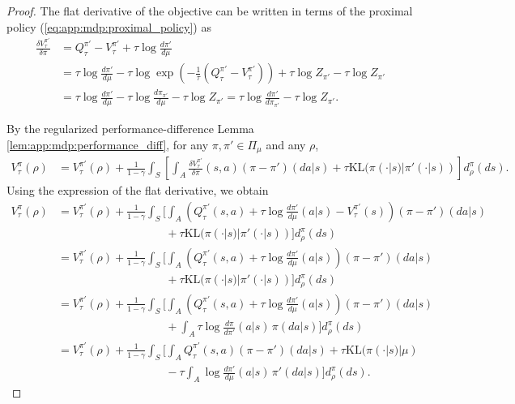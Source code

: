 \documentclass[10pt,a4paper]{amsart}
\begin{document}
\begin{proof}
The flat derivative of the objective can be written in terms of the proximal
policy (\ref{eq:app:mdp:proximal_policy}) as
\begin{align}
\frac{\delta V_\tau^{\pi'}}{\delta \pi}
&=
Q_\tau^{\pi'}-V_\tau^{\pi'}
+
\tau \log \frac{d\pi'}{d\mu}
\nonumber \\
&=
\tau \log \frac{d\pi'}{d\mu}
-
\tau
\log
\exp\left(
-\frac{1}{\tau}
\left(Q_\tau^{\pi'}-V_\tau^{\pi'}\right)
\right)
+
\tau \log Z_{\pi'}
-
\tau \log Z_{\pi'}
\nonumber \\
&=
\tau \log \frac{d\pi'}{d\mu}
-
\tau \log \frac{d\pi_{\pi'}}{d\mu}
-
\tau \log Z_{\pi'}
=
\tau \log \frac{d\pi'}{d\pi_{\pi'}}
-
\tau \log Z_{\pi'} .
\label{eq:sandwich-flat-derivative}
\end{align}

By the regularized performance-difference Lemma \ref{lem:app:mdp:performance_diff}, for any $\pi,\pi' \in \Pi_\mu$ and
any $\rho$,
\begin{align}
V_\tau^\pi(\rho)
&=
V_\tau^{\pi'}(\rho)
+
\frac{1}{1-\gamma}
\int_S
\left[
\int_A
\frac{\delta V_\tau^{\pi'}}{\delta \pi}(s,a)
(\pi-\pi')(da| s)
+
\tau \mathrm{KL}(\pi(\cdot | s)| \pi'(\cdot | s))
\right]
d_\rho^\pi(ds).
\label{eq:sandwich-performance-difference}
\end{align}
Using the expression of the flat derivative, we obtain
\begin{align}
V_\tau^\pi(\rho)
&=
V_\tau^{\pi'}(\rho)
+
\frac{1}{1-\gamma}
\int_S
\bigg[
\int_A
\left(
Q_\tau^{\pi'}(s,a)
+
\tau \log \frac{d\pi'}{d\mu}(a|s)
-
V_\tau^{\pi'}(s)
\right)
(\pi-\pi')(da| s)
\nonumber \\
&\hspace{4cm}
+
\tau \mathrm{KL}(\pi(\cdot | s)| \pi'(\cdot |s))
\bigg]
d_\rho^\pi(ds)
\nonumber \\
&=
V_\tau^{\pi'}(\rho)
+
\frac{1}{1-\gamma}
\int_S
\bigg[
\int_A
\left(
Q_\tau^{\pi'}(s,a)
+
\tau \log \frac{d\pi'}{d\mu}(a|s)
\right)
(\pi-\pi')(da| s)
\nonumber \\
&\hspace{4cm}
+
\tau \mathrm{KL}(\pi(\cdot | s)| \pi'(\cdot |s))
\bigg]
d_\rho^\pi(ds)
\nonumber \\
&=
V_\tau^{\pi'}(\rho)
+
\frac{1}{1-\gamma}
\int_S
\bigg[
\int_A
\left(
Q_\tau^{\pi'}(s,a)
+
\tau \log \frac{d\pi'}{d\mu}(a | s)
\right)
(\pi-\pi')(da| s)
\nonumber \\
&\hspace{4cm}
+
\int_A
\tau \log \frac{d\pi}{d\pi'}(a | s)
\,\pi(da| s)
\bigg]
d_\rho^\pi(ds)
\nonumber \\
&=
V_\tau^{\pi'}(\rho)
+
\frac{1}{1-\gamma}
\int_S
\bigg[
\int_A
Q_\tau^{\pi'}(s,a)
(\pi-\pi')(da| s)
+
\tau \mathrm{KL}(\pi(\cdot |s)| \mu)
\nonumber \\
&\hspace{4cm}
-
\tau
\int_A
\log \frac{d\pi'}{d\mu}(a|s)
\,\pi'(da| s)
\bigg]
d_\rho^\pi(ds).
\label{eq:sandwich-expanded-difference}
\end{align}


\end{proof}
\end{document}
